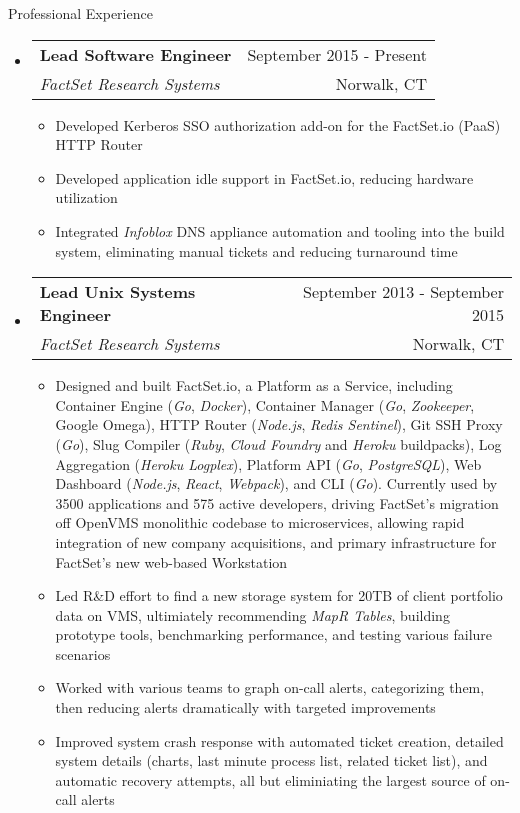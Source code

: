 \documentclass[letterpaper,10pt]{article}
\makeatletter
\newenvironment{ressection}[1]{
	\vspace{4pt}
	{\fontfamily{phv}\selectfont\Large#1}
	\begin{itemize}
	\vspace{3pt}
}{
	\end{itemize}
}
\newcommand{\ressubitem}[1]{
	\vspace{-1pt}
	\item \begin{flushleft} #1 \end{flushleft}
}
\newcommand{\resbigitem}[4]{
	\vspace{-5pt}
	\item
	\begin{tabular*}{6in}{l@{\extracolsep{\fill}}r}
		\textbf{#1} & #2 \\
		\textit{#3} & #4\\
	\end{tabular*}
}
\newenvironment{ressubsec}[4]{
	\resbigitem{#1}{#2}{#3}{#4}
	\vspace{-2pt}
	\begin{itemize}
}{
	\end{itemize}
}
\makeatother
\begin{document}
\begin{ressection}{Professional Experience}
\begin{ressubsec}{Lead Software Engineer}{September 2015 - Present}{FactSet Research Systems}{Norwalk, CT}
		\ressubitem{Developed Kerberos SSO authorization add-on for the FactSet.io (PaaS) HTTP Router}
		\ressubitem{Developed application idle support in FactSet.io, reducing hardware utilization}
		\ressubitem{Integrated \textit{Infoblox} DNS appliance automation and tooling into the build system, eliminating manual tickets and reducing turnaround time}
	\end{ressubsec}
	\begin{ressubsec}{Lead Unix Systems Engineer}{September 2013 - September 2015}{FactSet Research Systems}{Norwalk, CT}
		\ressubitem{Designed and built FactSet.io, a Platform as a Service, including Container Engine (\textit{Go}, \textit{Docker}), Container Manager (\textit{Go}, \textit{Zookeeper}, Google Omega), HTTP Router (\textit{Node.js}, \textit{Redis Sentinel}), Git SSH Proxy (\textit{Go}), Slug Compiler (\textit{Ruby}, \textit{Cloud Foundry} and \textit{Heroku} buildpacks), Log Aggregation (\textit{Heroku Logplex}), Platform API (\textit{Go}, \textit{PostgreSQL}), Web Dashboard (\textit{Node.js}, \textit{React}, \textit{Webpack}), and CLI (\textit{Go}).  Currently used by 3500 applications and 575 active developers, driving FactSet's migration off OpenVMS monolithic codebase to microservices, allowing rapid integration of new company acquisitions, and primary infrastructure for FactSet's new web-based Workstation}
		\ressubitem{Led R\&D effort to find a new storage system for 20TB of client portfolio data on VMS, ultimiately recommending \textit{MapR Tables}, building prototype tools, benchmarking performance, and testing various failure scenarios}
		\ressubitem{Worked with various teams to graph on-call alerts, categorizing them, then reducing alerts dramatically with targeted improvements}
		\ressubitem{Improved system crash response with automated ticket creation, detailed system details (charts, last minute process list, related ticket list), and automatic recovery attempts, all but eliminiating the largest source of on-call alerts}
	\end{ressubsec}
\pagebreak


\end{ressection}
\end{document}

